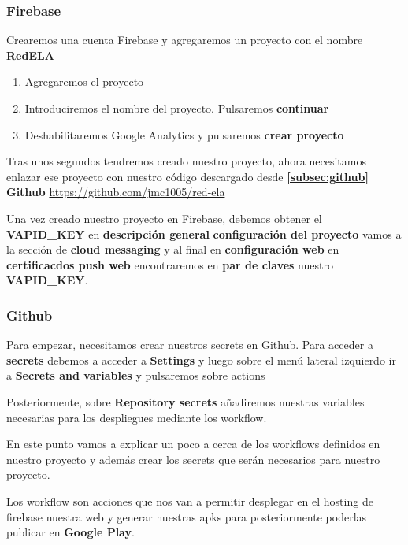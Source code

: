 \subsubsection{\label{subsec:firebase}Firebase}
Crearemos una cuenta Firebase y agregaremos un proyecto con el nombre \textbf{RedELA}
\begin{enumerate}
\item Agregaremos el proyecto 
\item Introduciremos el nombre del proyecto. Pulsaremos \textbf{continuar}
\item Deshabilitaremos Google Analytics y pulsaremos \textbf{crear proyecto}
\end{enumerate}

Tras unos segundos tendremos creado nuestro proyecto, ahora necesitamos enlazar ese proyecto con nuestro código descargado desde \textbf{\ref{subsec:github} Github} \url{https://github.com/jmc1005/red-ela}

Una vez creado nuestro proyecto en Firebase, debemos obtener el \textbf{VAPID\_KEY} en \textbf{descripción general} \textbf{configuración del proyecto} vamos a la sección de \textbf{cloud messaging} y al final en \textbf{configuración web} en \textbf{certificacdos push web} encontraremos en \textbf{par de claves} nuestro \textbf{VAPID\_KEY}.

\subsubsection{\label{subsec:github}Github}
Para empezar, necesitamos crear nuestros secrets en Github. Para acceder a \textbf{secrets} debemos a acceder a \textbf{Settings} y luego sobre el menú lateral izquierdo ir a \textbf{Secrets and variables} y pulsaremos sobre actions

Posteriormente, sobre \textbf{Repository secrets} añadiremos nuestras variables necesarias para los despliegues mediante los workflow.

En este punto vamos a explicar un poco a cerca de los workflows definidos en nuestro proyecto y además crear los secrets que serán necesarios para nuestro proyecto.

Los workflow son acciones que nos van a permitir desplegar en el hosting de firebase nuestra web y generar nuestras apks para posteriormente poderlas publicar en \textbf{Google Play}.


